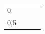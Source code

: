 {{\begin{center}
\begin{tabular}[t]{|l|l|l|l|}
    
        0 &
    
    
         &
    
    
         &
    
    
     \tabularnewline\cline{1-1}\cline{2-2}\cline{3-3}\cline{4-4}
    
    
        0,5 &
    
    
         &
    
    
         &
    
    
     \tabularnewline\cline{1-1}\cline{2-2}\cline{3-3}\cline{4-4}
    
    

\end{tabular}
\end{center}}}
